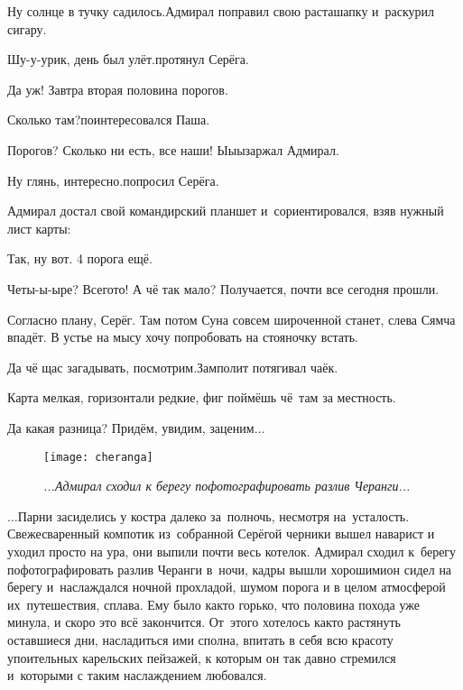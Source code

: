 \diagdash Ну солнце в тучку садилось.\mdash Адмирал поправил свою раста\sdash шапку и~раскурил сигару. 

\diagdash Шу-у-урик, день был улёт.\mdash протянул Серёга.

\diagdash Да уж! Завтра вторая половина порогов.

\diagdash Сколько там?\mdash поинтересовался Паша.

\diagdash Порогов? Сколько ни есть, все наши! Ы\sdash ы\sdash ы\mdash заржал Адмирал.

\diagdash Ну глянь, интересно.\mdash попросил Серёга.

Адмирал достал свой командирский планшет и~сориентировался, взяв нужный лист карты:

\diagdash Так, ну вот. 4 порога ещё.

\diagdash Четы-ы-ыре? Всего\sdash то! А чё так мало? Получается, почти все сегодня прошли.

\diagdash Согласно плану, Серёг. Там потом Суна совсем широченной станет, слева Сямча впадёт. В устье на мысу хочу попробовать на стояночку встать.

\diagdash Да чё щас загадывать, посмотрим.\mdash Замполит потягивал чаёк.

\diagdash Карта мелкая, горизонтали редкие, фиг поймёшь чё~там за местность.

\diagdash Да какая разница? Придём, увидим, заценим$\ldots$


\setlength{\belowcaptionskip}{1.0mm}

\begin{figure}[h]
	\centering
	\texttt{[image: cheranga]}
	\caption{\small\textit{...Адмирал сходил к берегу пофотографировать разлив Черанги...}}
\end{figure}


$\ldots$Парни засиделись у костра далеко за~полночь, несмотря на~усталость. Свежесваренный компотик из~собранной Серёгой черники вышел наварист и уходил просто на ура, они выпили почти весь котелок. Адмирал сходил к~берегу пофотографировать разлив Черанги в~ночи, 
кадры вышли хорошими\mdash он сидел на берегу и~наслаждался ночной прохладой, шумом порога и в целом атмосферой их~путешествия, сплава. Ему было как\sdash то горько, что половина похода уже минула, и скоро это всё закончится. От~этого хотелось как\sdash то растянуть оставшиеся дни, насладиться ими сполна, впитать в себя всю красоту упоительных карельских пейзажей, к которым он так давно стремился и~которыми с таким наслаждением любовался.


\begin{center}
\end{center}
